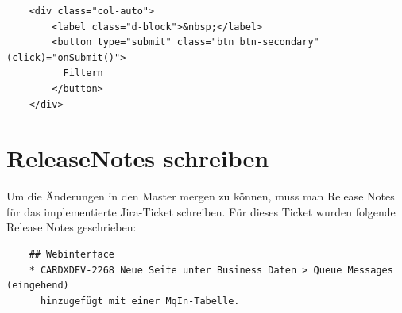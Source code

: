 \begin{verbatim}
	<div class="col-auto">
	    <label class="d-block">&nbsp;</label>
	    <button type="submit" class="btn btn-secondary" (click)="onSubmit()">
	      Filtern
	    </button>
	</div>
\end{verbatim}

\section{ReleaseNotes schreiben}
Um die Änderungen in den Master mergen zu können, muss man Release Notes für das implementierte Jira-Ticket schreiben. Für dieses Ticket wurden folgende Release Notes geschrieben:

\begin{verbatim}
	## Webinterface
	* CARDXDEV-2268 Neue Seite unter Business Daten > Queue Messages (eingehend)
	  hinzugefügt mit einer MqIn-Tabelle.
\end{verbatim}
\newpage
